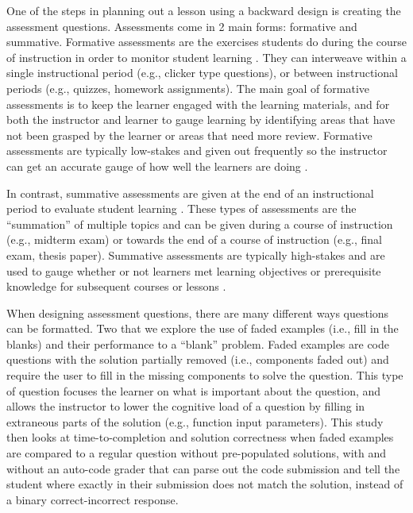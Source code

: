 \documentclass[040-assessment.tex]{subfiles}
\begin{document}
One of the steps in planning out a lesson using a backward design is creating the assessment questions.
Assessments come in 2 main forms: formative and summative.
Formative assessments are the exercises students do during the course of instruction
in order to monitor student learning
\cite{universityFormativeVsSummative, wilson2019teaching}.
They can interweave within a single instructional period (e.g., clicker type questions),
or between instructional periods (e.g., quizzes, homework assignments).
The main goal of formative assessments is to keep the learner engaged with the learning materials,
and for both the instructor and learner to gauge learning by identifying areas that have not been grasped by the
learner or areas that need more review.
Formative assessments are typically low-stakes and given out frequently so the instructor
can get an accurate gauge of how well the learners are doing
\cite{universityFormativeVsSummative, wilson2019teaching}.

In contrast, summative assessments are given at the end of an instructional period
to evaluate student learning
\cite{universityFormativeVsSummative, wilson2019teaching}.
These types of assessments are the ``summation'' of multiple topics and can be given
during a course of instruction (e.g., midterm exam)
or towards the end of a course of instruction (e.g., final exam, thesis paper).
Summative assessments are typically high-stakes and
are used to gauge whether or not learners met learning objectives or
prerequisite knowledge for subsequent courses or lessons
\cite{universityFormativeVsSummative, wilson2019teaching}.

When designing assessment questions, there are many different ways questions can be formatted.
Two that we explore the use of faded examples (i.e., fill in the blanks)
and their performance to a ``blank'' problem.
Faded examples are code questions with the solution partially removed (i.e., components faded out)
and require the user to fill in the missing components to solve the question.
This type of question focuses the learner on what is important about the question,
and allows the instructor to lower the cognitive load of a question by filling in
extraneous parts of the solution (e.g., function input parameters).
This study then looks at time-to-completion and solution correctness
when faded examples are compared to a regular question without pre-populated solutions,
with and without an auto-code grader that can parse out the code submission and
tell the student where
exactly in their submission does not match the solution,
instead of a binary correct-incorrect response.
\end{document}
